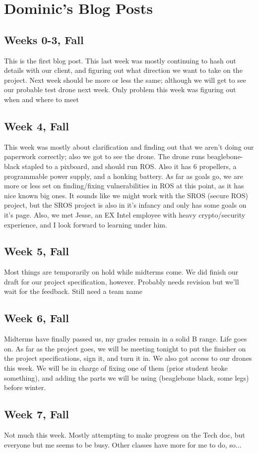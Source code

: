 \section{Dominic's Blog Posts}
\subsection{Weeks 0-3, Fall}
This is the first blog post. This last week was mostly continuing to hash out details with our client, and figuring out what direction we want to take on the project. Next week should be more or less the same; although we will get to see our probable test drone next week. Only problem this week was figuring out when and where to meet
\subsection{Week 4, Fall}
This week was mostly about clarification and finding out that we aren't doing our paperwork correctly; also we got to see the drone. The drone runs beaglebone-black stapled to a pixboard, and should run ROS. Also it has 6 propellers, a programmable power supply, and a honking battery. 
As far as goals go, we are more or less set on finding/fixing vulnerabilities in ROS at this point, as it has nice known big ones. It sounds like we might work with the SROS (secure ROS) project, but the SROS project is also in it's infancy and only has some goals on it's page.
Also, we met Jesse, an EX Intel employee with heavy crypto/security experience, and I look forward to learning under him.
\subsection{Week 5, Fall}
Most things are temporarily on hold while midterms come. We did finish our draft for our project specification, however. Probably needs revision but we'll wait for the feedback. Still need a team name
\subsection{Week 6, Fall}
Midterms have finally passed us, my grades remain in a solid B range. Life goes on. As far as the project goes, we will be meeting tonight to put the finisher on the project specifications, sign it, and turn it in. We also got access to our drones this week. We will be in charge of fixing one of them (prior student broke something), and adding the parts we will be using (beaglebone black, some legs) before winter.
\subsection{Week 7, Fall}
Not much this week. Mostly attempting to make progress on the Tech doc, but everyone but me seems to be busy. Other 
classes have more for me to do, so...
